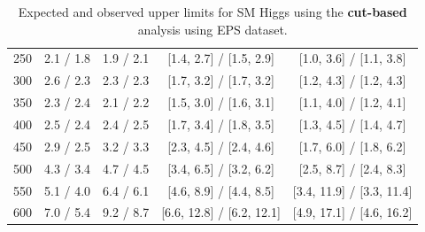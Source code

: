 \begin{table}[hbp!]
\begin{center}
\begin{tabular}{c c c c c}
250 & 2.1 / 1.8 & 1.9 / 2.1 & [1.4, 2.7] / [1.5, 2.9] & [1.0, 3.6] / [1.1, 3.8] \\
300 & 2.6 / 2.3 & 2.3 / 2.3 & [1.7, 3.2] / [1.7, 3.2] & [1.2, 4.3] / [1.2, 4.3] \\
350 & 2.3 / 2.4 & 2.1 / 2.2 & [1.5, 3.0] / [1.6, 3.1] & [1.1, 4.0] / [1.2, 4.1] \\
400 & 2.5 / 2.4 & 2.4 / 2.5 & [1.7, 3.4] / [1.8, 3.5] & [1.3, 4.5] / [1.4, 4.7] \\
450 & 2.9 / 2.5 & 3.2 / 3.3 & [2.3, 4.5] / [2.4, 4.6] & [1.7, 6.0] / [1.8, 6.2] \\
500 & 4.3 / 3.4 & 4.7 / 4.5 & [3.4, 6.5] / [3.2, 6.2] & [2.5, 8.7] / [2.4, 8.3] \\
550 & 5.1 / 4.0 & 6.4 / 6.1 & [4.6, 8.9] / [4.4, 8.5] & [3.4, 11.9] / [3.3, 11.4] \\
600 & 7.0 / 5.4 & 9.2 / 8.7 & [6.6, 12.8] / [6.2, 12.1] & [4.9, 17.1] / [4.6, 16.2] \\

\hline
\end{tabular}
\caption{Expected and observed upper limits for SM Higgs using the
  {\bf cut-based} analysis using EPS dataset.}
\label{tab:cutbase_uls_eps}
\end{center}
\end{table}

